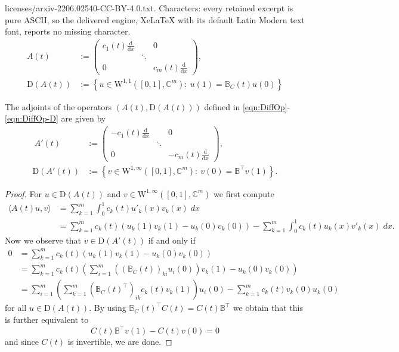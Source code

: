 \documentclass[10pt,a4paper]{amsart}
\def\BB{\mathbb{B}}
\def\W{\mathrm{W}}
\def\dd{\mathrm{d}}
\def\dom{\mathrm{D}}
\begin{document}
licenses/arxiv-2206.02540-CC-BY-4.0.txt. Characters: every retained excerpt is pure ASCII, so the delivered engine, XeLaTeX with its default Latin Modern text font, reports no missing character.
\begin{align}\label{eqn:DiffOp}
A(t)&:=\begin{pmatrix}
c_1(t)\frac{\dd}{\dd{x}}& &0\\
& \ddots &\\
0& & c_m(t)\frac{\dd}{\dd{x}}
\end{pmatrix},\\
\dom(A(t))&:=\left\{u\in \W^{1,1}\left(\left[0,1\right],\mathbb{C}^m\right):\ u(1)=\mathbb{B}_C(t)u(0)\right\}
\label{eqn:DiffOp-D}
\end{align}

\begin{lemma}\label{lem:adj}
The adjoints of the operators  $(A(t),\dom(A(t)))$ defined in \eqref{eqn:DiffOp}-\eqref{eqn:DiffOp-D} are given  by
\begin{align*}\
A'(t)&:=\begin{pmatrix}
- c_1(t)\frac{\dd}{\dd{x}}& &0\\
& \ddots &\\
0& &- c_m(t)\frac{\dd}{\dd{x}}
\end{pmatrix},\\
\dom(A'(t))&:=\left\{v\in \W^{1,\infty}\left(\left[0,1\right],\mathbb{C}^m\right):\ v(0)=\mathbb{B}^{\top}v(1)\right\}.
\label{eqn:DiffOp-DAdj}
\end{align*}
\end{lemma}

\begin{proof}
For $u\in \dom(A(t))$ and $v\in \W^{1,\infty}\left(\left[0,1\right],\mathbb{C}^m\right)$ we first compute
 \begin{align*}
 \langle A(t)  u,v\rangle &= \sum_{k=1}^m \int_0^1 c_k(t) u'_k(x) v_k(x) \; dx \\
 &= \sum_{k=1}^m  c_k(t) \left(u_k(1) v_k(1) -  u_k(0) v_k(0) \right) -\sum_{k=1}^m \int_0^1 c_k(t) u_k(x) v'_k(x) \; dx.
 \end{align*}
 Now we observe that $v \in \dom(A'(t))$ if and only if 
 \begin{align*}
 0 &=   \sum_{k=1}^m  c_k(t) \left(u_k(1) v_k(1) -  u_k(0) v_k(0) \right) \\
 &=\sum_{k=1}^m  c_k(t)  \left( \sum_{i=1}^m \left(\left(\BB_C(t)\right)_{ki} u_i(0) \right)v_k(1) -  u_k(0) v_k(0) \right)  \\
  &=  \sum_{i=1}^m \left( \sum_{k=1}^m  \left(\BB_C(t)^{\top}\right)_{ik} c_k(t)  v_k(1) \right) u_i(0)  -  \sum_{k=1}^m c_k(t) v_k(0) u_k(0)
  \end{align*}
  for all  $u\in \dom(A(t))$. By using $\BB_C(t) ^{\top} C(t) = C(t) \BB^{\top} $ we  obtain that this is further equivalent to 
\[C(t) \BB^{\top}  v(1) - C(t) v(0)=0\]
and since $C(t)$ is invertible, we are done.
\end{proof}
\end{document}
